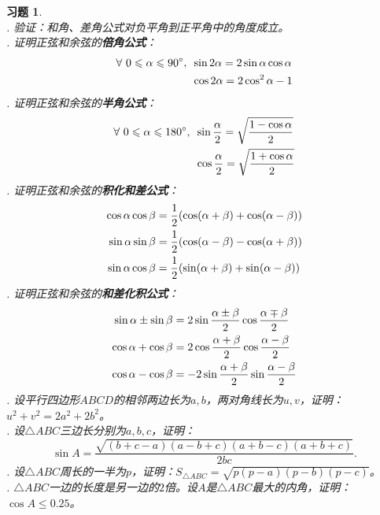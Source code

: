 \documentclass[12pt,UTF8]{ctexbook}
\newtheorem{xt}{习题}[section]
\begin{document}
\begin{xt}\label{xt:2-4-10}
    \mbox{} \\
    . 验证：和角、差角公式对负平角到正平角中的角度成立。 \\
    . 证明正弦和余弦的\textbf{倍角公式}：
    \begin{align}
        \forall \,\, 0 \leqslant \alpha \leqslant 90^\circ , \,\,\, & \sin 2\alpha = 2\sin \alpha \cos \alpha \notag \\
        & \cos 2\alpha = 2\cos^2 \alpha - 1 \notag 
    \end{align}
    . 证明正弦和余弦的\textbf{半角公式}：
    \begin{align}
        \forall \,\, 0 \leqslant \alpha \leqslant 180^\circ , \,\,\, & \sin \frac{\alpha}{2} = \sqrt{\frac{1 - \cos \alpha}{2}}  \notag \\
        & \cos \frac{\alpha}{2} = \sqrt{\frac{1 + \cos \alpha}{2}} \notag
    \end{align}
    . 证明正弦和余弦的\textbf{积化和差公式}：
    \begin{align}
        \cos \alpha \cos \beta &= \frac12 (\cos (\alpha + \beta) + \cos (\alpha - \beta)) \notag \\
        \sin \alpha \sin \beta &= \frac12 (\cos (\alpha - \beta) - \cos (\alpha + \beta)) \notag \\
        \sin \alpha \cos \beta &= \frac12 (\sin (\alpha + \beta) + \sin (\alpha - \beta)) \notag 
    \end{align}
    . 证明正弦和余弦的\textbf{和差化积公式}：
    \begin{align}
        \sin \alpha \pm \sin \beta &= 2\sin \frac{\alpha \pm \beta}{2} \cos \frac{\alpha \mp \beta}{2} \notag \\
        \cos \alpha + \cos \beta &= 2\cos \frac{\alpha + \beta}{2} \cos \frac{\alpha - \beta}{2} \notag \\
        \cos \alpha - \cos \beta &= -2\sin \frac{\alpha + \beta}{2} \sin \frac{\alpha - \beta}{2} \notag 
    \end{align}
    . 设平行四边形$ABCD$的相邻两边长为$a,b$，两对角线长为$u,v$，证明：$u^2 + v^2 = 2a^2 + 2b^2$。 \\
    . 设$\triangle ABC$三边长分别为$a,b,c$，证明：
    $$\sin A = \frac{\sqrt{(b+c-a)(a-b+c)(a+b-c)(a+b+c)}}{2bc}.$$ 
    . 设$\triangle ABC$周长的一半为$p$，证明：$S_{\triangle ABC} = \sqrt{p(p-a)(p-b)(p-c)}$。 \\
    . $\triangle ABC$一边的长度是另一边的$2$倍。设$A$是$\triangle ABC$最大的内角，证明：$\cos A \leqslant 0.25$。

\end{xt}
\end{document}
